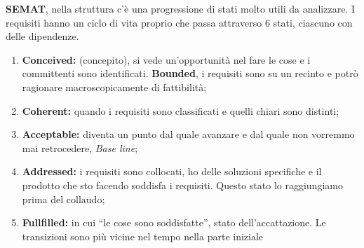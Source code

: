 \textbf{SEMAT}, nella struttura c'è una progressione di stati molto utili da analizzare. I requisiti hanno un ciclo di vita proprio che passa attraverso 6 stati, ciascuno con delle dipendenze.
\begin{enumerate}
	\item \textbf{Conceived:} (concepito), si vede un'opportunità nel fare le cose e i committenti sono identificati. \textbf{Bounded}, i requisiti sono su un recinto e potrò ragionare macroscopicamente di fattibilità;
	\item \textbf{Coherent:} quando i requisiti sono classificati e quelli chiari sono distinti;
	\item \textbf{Acceptable:} diventa un punto dal quale avanzare e dal quale non vorremmo mai retrocedere, \textit{Base line};
	\item \textbf{Addressed:} i requisiti sono collocati, ho delle soluzioni specifiche e il prodotto che sto facendo soddisfa i requisiti. Questo stato lo raggiungiamo prima del collaudo;
	\item \textbf{Fullfilled:} in cui ``le cose sono soddisfatte'', stato dell'accattazione. Le transizioni sono più vicine nel tempo nella parte iniziale
\end{enumerate} 

